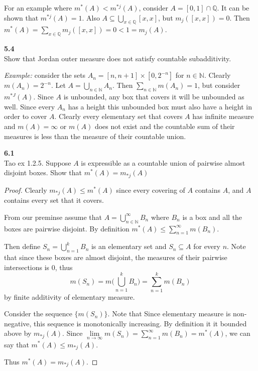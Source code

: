 \documentclass[12pt]{article}
\newcommand{\problem}[1]{\hspace{-4 ex} \large \textbf{#1}\\}
\begin{document}
	For an example where $m^*(A)<m^{*j}(A)$, consider $A = [0,1] \cap \mathbb{Q}$. It can be shown that $m^{*j}(A)=1$. Also $A \subseteq \bigcup\limits_{x \in \mathbb{Q}}[x,x]$, but $m_j([x,x])=0$. Then $m^*(A) = \sum\limits_{x \in \mathbb{Q}}m_j([x,x]) = 0 < 1 = m_j(A)$. 


\problem{5.4} Show that Jordan outer measure does not satisfy countable subadditivity.

	\textit{Example:} consider the sets $A_n = [n,n+1] \times [0, 2^{-n}]$ for $n \in \mathbb{N}$. Clearly $m(A_n) = 2^{-n}$. Let $A = \bigcup\limits_{n \in \mathbb{N}}A_n$. Then $\sum\limits_{n \in \mathbb{N}}m(A_n) = 1$, but consider $m^{*J}(A)$. Since $A$ is unbounded, any box that covers it will be unbounded as well. Since every $A_n$ has a height this unbounded box must also have a height in order to cover $A$. Clearly every elementary set that covers $A$ has infinite measure and $m(A) = \infty$ or $m(A)$ does not exist and the countable sum of their measures is less than the measure of their countable union.



\problem{6.1}Tao ex 1.2.5. Suppose $A$ is expressible as a countable union of pairwise almost disjoint boxes. Show that $m^*(A)=m_{*j}(A)$ 
	\begin{proof}
		Clearly $m_{*j}(A) \leq m^*(A)$ since every covering of $A$ contains $A$, and $A$ contains every set that it covers. \bigbreak
		
		From our preminse assume that $A = \bigcup\limits_{n \in \mathbb{N}}^\infty B_n$ where $B_n$ is a box and all the boxes are pairwise disjoint. By definition $m^*(A) \leq \sum\limits_{n=1}^\infty m(B_n)$. \bigbreak
		
		Then define $S_n = \bigcup\limits_{n=1}^k B_n$ is an elementary set and $S_n \subseteq A$ for every $n$. Note that since these boxes are almost disjoint, the measures of their pairwise intersections is $0$, thus 
		$$m(S_n) = m\Big(\bigcup\limits_{n=1}^k B_n \Big) = \sum\limits_{n=1}^k m(B_n)$$
		by finite additivity of elementary measure.
		
		Consider the sequence $\{m(S_n)\}$. Note that Since elementary measure is non-negative, this sequence is monotonically increasing. By definition it it bounded above by  $m_{*j}(A)$. Since $\lim\limits_{n \to \infty} m(S_n) = \sum\limits_{n=1}^\infty m(B_n) = m^*(A)$, we can say that $m^*(A) \leq m_{*j}(A)$. \bigbreak
		
		Thus $m^*(A)=m_{*j}(A)$.		
	\end{proof}
\end{document}
